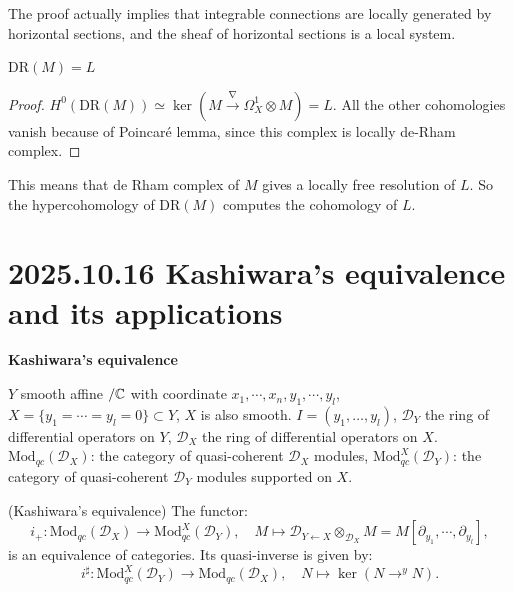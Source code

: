 \documentclass[12pt]{amsart}
\numberwithin{equation}{section}
\begin{document}
\begin{rk}
  The proof actually implies that integrable connections are locally generated by horizontal sections, and the sheaf of horizontal sections is a local system.
\end{rk}

\begin{cor}
  $\mathrm{DR}(M) = L $
\end{cor}

\begin{proof}
  $H^0(\mathrm{DR}(M)) \simeq \ker(M \xrightarrow{\nabla} \Omega^1_X \otimes M) = L$. All the other cohomologies vanish because of Poincar\'e  lemma, since this complex is locally de-Rham complex.
\end{proof}

\begin{rk}
  This means that de Rham complex of $M$ gives a locally free resolution of $L$. So the hypercohomology of $\mathrm{DR}(M)$ computes the cohomology of $L$.
\end{rk}




\section{2025.10.16 Kashiwara's equivalence and its applications}

\textbf{Kashiwara's equivalence }

$Y$ smooth affine $/ {\mathbb {C}}$  with coordinate $x_1,\cdots,x_n,y_1,\cdots,y_l$, $X = \{y_1 = \cdots = y_l = 0\} \subset Y$, $X$ is also smooth. $I = (y_1,\ldots,y_l)$, $\mathcal{D}_Y$ the ring of differential operators on $Y$, $\mathcal{D}_X$ the ring of differential operators on $X$. $\mathrm{Mod}_{qc}(\mathcal{D}_X)$: the category of quasi-coherent $\mathcal{D}_X$ modules, $\mathrm{Mod}^X_{qc}(\mathcal{D}_Y)$: the category of quasi-coherent $\mathcal{D}_Y$ modules supported on $X$.

\begin{thm}
  (Kashiwara's equivalence) The functor:
  \[
    i_+ : \mathrm{Mod}_{qc}(\mathcal{D}_X) \to \mathrm{Mod}^X_{qc}(\mathcal{D}_Y), \quad M \mapsto \mathcal{D}_{Y \leftarrow X} \otimes_{\mathcal{D}_X} M = M[\partial_{y_1},\cdots,\partial_{y_l}],
  \]
  is an equivalence of categories. Its quasi-inverse is given by:
  \[
    i^{\sharp} : \mathrm{Mod}^X_{qc}(\mathcal{D}_Y) \to \mathrm{Mod}_{qc}(\mathcal{D}_X), \quad N \mapsto \ker(N \longrightarrow^{y} N).
  \]
\end{thm}
\end{document}
